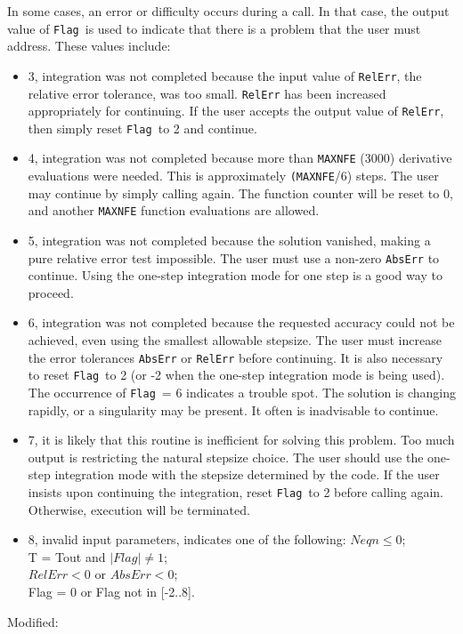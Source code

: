 \documentclass[12pt,a4paper,oneside]{report}
\newcommand{\code}[1]{\texttt{#1}}
\begin{document}
\begin{itemize}
	In some cases, an error or difficulty occurs during a call.  In that case,
	the output value of \code{Flag}\ is used to indicate that there is a problem
	that the user must address.  These values include:
	\begin{itemize}
		\item 3, integration was not completed because the input value of \code{RelErr}, the
		relative error tolerance, was too small.  \code{RelErr} has been increased
		appropriately for continuing.  If the user accepts the output value of
		\code{RelErr}, then simply reset \code{Flag}\ to 2 and continue.
		\item 4, integration was not completed because more than \code{MAXNFE} (3000) derivative
		evaluations were needed.  This is approximately \code{(MAXNFE}/6) steps.
		The user may continue by simply calling again.  The function counter
		will be reset to 0, and another \code{MAXNFE} function evaluations are allowed.
		\item 5, integration was not completed because the solution vanished,
		making a pure relative error test impossible.  The user must use
		a non-zero \code{AbsErr} to continue.  Using the one-step integration mode
		for one step is a good way to proceed.
		\item 6, integration was not completed because the requested accuracy
		could not be achieved, even using the smallest allowable stepsize.
		The user must increase the error tolerances \code{AbsErr} or \code{RelErr} before
		continuing.  It is also necessary to reset \code{Flag}\ to 2 (or -2 when
		the one-step integration mode is being used).  The occurrence of
		\code{Flag}\ = 6 indicates a trouble spot.  The solution is changing
		rapidly, or a singularity may be present.  It often is inadvisable
		to continue.
		\item 7, it is likely that this routine is inefficient for solving
		this problem.  Too much output is restricting the natural stepsize
		choice.  The user should use the one-step integration mode with
		the stepsize determined by the code.  If the user insists upon
		continuing the integration, reset \code{Flag}\ to 2 before calling
		again.  Otherwise, execution will be terminated.
		\item 8, invalid input parameters, indicates one of the following:
		$Neqn \le 0$;\\
		T = Tout and $|Flag| \ne 1$;\\
		$RelErr < 0$ or $AbsErr < 0$;\\
		Flag = 0  or Flag not in [-2..8].
	\end{itemize}
	Modified:
	

\end{itemize}
\end{document}
